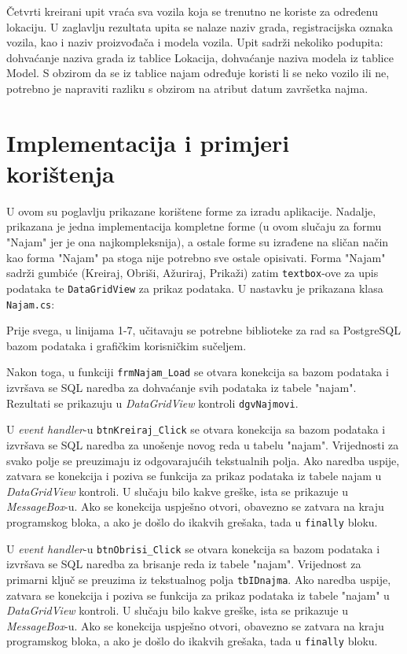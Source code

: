 \documentclass[]{foi}
\begin{document}
Četvrti kreirani upit vraća sva vozila koja se trenutno ne koriste za određenu lokaciju. U zaglavlju rezultata upita se nalaze naziv grada, registracijska oznaka vozila, kao i naziv proizvođača i modela vozila. Upit sadrži nekoliko podupita: dohvaćanje naziva grada iz tablice Lokacija, dohvaćanje naziva modela iz tablice Model. S obzirom da se iz tablice najam određuje koristi li se neko vozilo ili ne, potrebno je napraviti razliku s obzirom na atribut datum završetka najma.

\chapter{Implementacija i primjeri korištenja}

U ovom su poglavlju prikazane korištene forme za izradu aplikacije. Nadalje, prikazana je jedna implementacija kompletne forme (u ovom slučaju za formu "Najam" jer je ona najkompleksnija), a ostale forme su izrađene na sličan način kao forma "Najam" pa stoga nije potrebno sve ostale opisivati. Forma "Najam" sadrži gumbiće (Kreiraj, Obriši, Ažuriraj, Prikaži) zatim \texttt{textbox}-ove za upis podataka te \texttt{DataGridView} za prikaz podataka. U nastavku je prikazana klasa \texttt{Najam.cs}:
\vspace{5mm}

Prije svega, u linijama 1-7, učitavaju se potrebne biblioteke za rad sa PostgreSQL bazom podataka i grafičkim korisničkim sučeljem.

Nakon toga, u funkciji \texttt{frmNajam\_Load} se otvara konekcija sa bazom podataka i izvršava se SQL naredba za dohvaćanje svih podataka iz tabele "najam". Rezultati se prikazuju u \textit{DataGridView} kontroli \texttt{dgvNajmovi}.

U \textit{event handler}-u \texttt{btnKreiraj\_Click} se otvara konekcija sa bazom podataka i izvršava se SQL naredba za unošenje novog reda u tabelu "najam". Vrijednosti za svako polje se preuzimaju iz odgovarajućih tekstualnih polja. Ako naredba uspije, zatvara se konekcija i poziva se funkcija za prikaz podataka iz tabele najam u \textit{DataGridView} kontroli. U slučaju bilo kakve greške, ista se prikazuje u \textit{MessageBox}-u. Ako se konekcija uspješno otvori, obavezno se zatvara na kraju programskog bloka, a ako je došlo do ikakvih grešaka, tada u \texttt{finally} bloku.

U \textit{event handler}-u \texttt{btnObrisi\_Click} se otvara konekcija sa bazom podataka i izvršava se SQL naredba za brisanje reda iz tabele "najam". Vrijednost za primarni ključ se preuzima iz tekstualnog polja \texttt{tbIDnajma}. Ako naredba uspije, zatvara se konekcija i poziva se funkcija za prikaz podataka iz tabele "najam" u \textit{DataGridView} kontroli. U slučaju bilo kakve greške, ista se prikazuje u \textit{MessageBox}-u. Ako se konekcija uspješno otvori, obavezno se zatvara na kraju programskog bloka, a ako je došlo do ikakvih grešaka, tada u \texttt{finally} bloku.
\end{document}
